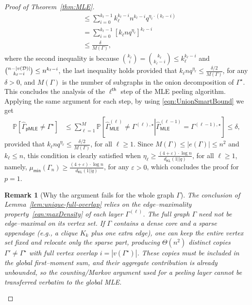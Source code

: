 \documentclass[12pt]{article}
\newtheorem{remark}{Remark}
\newcommand {\pr} {\mathbb{P}}
\newcommand{\calD}{{\cal D}}
\newcommand{\pp}[1]{\left[#1\right]}
\newcommand{\s}[1]{\mathsf{#1}}
\begin{document}
\begin{proof}[Proof of Theorem~\ref{thm:MLE}]
\begin{align}
    &\leq \sum_{i=0}^{k_\ell-1}k_\ell^{k_\ell-i}n^{k_\ell-i} q^{\eta_\ell\cdot(k_\ell-i)}\\
    & = \sum_{i=0}^{k_\ell-1}\pp{k_\ell n q^{\eta_\ell}}^{k_\ell-i}\\
    &\leq \frac{\delta}{M(\Gamma)},\label{eqn:samePP1}
\end{align}
where the second inequality is because $\binom{k_\ell}{i} = \binom{k_\ell}{k_\ell-i}\leq k_\ell^{k_\ell-i}$ and $\binom{n-|v(\calD)|}{k_\ell-i}\leq n^{k_\ell-i}$, the last inequality holds provided that $k_\ell nq^{\eta_\ell}\leq \frac{\delta/2}{M(\Gamma)}$, for any $\delta>0$, and $M(\Gamma)$ is the number of subgraphs in the onion decomposition of $\Gamma^\star$. This concludes the analysis of the $\ell^{\s{th}}$ step of the MLE peeling algorithm. Applying the same argument for each step, by using \eqref{eqn:UnionSmartBound} we get
\begin{align}
    \pr[\hat{\Gamma}_{\s{pMLE}}\neq\Gamma^{\star}] &\leq \sum_{\ell=1}^M\pr\pp{\left.\hat{\Gamma}^{(\ell)}_{\s{MLE}}\neq{\Gamma}^{(\ell),\star}\right|\hat{\Gamma}^{(\ell-1)}_{\s{MLE}}={\Gamma}^{(\ell-1),\star}}\leq \delta,\label{eqn:FinalMLEPeelP1ana}
\end{align}
provided that $k_\ell nq^{\eta_\ell}\leq \frac{\delta/2}{M(\Gamma)}$, for all $\ell\geq1$. Since $M(\Gamma)\leq|e(\Gamma)|\leq n^2$ and $k_\ell\leq n$, this condition is clearly satisfied when $\eta_\ell\geq \frac{(4+\varepsilon)\cdot \log n}{d_{\s{KL}}(1||q)}$, for all $\ell\geq1$, namely, $\mu_{\s{min}}(\Gamma_n)\geq \frac{(4+\varepsilon)\cdot \log n}{d_{\s{KL}}(1||q)}$, for any $\varepsilon>0$, which concludes the proof for $p=1$.
\begin{remark}[Why the argument fails for the whole graph $\Gamma$]
The conclusion of Lemma~\ref{lem:unique-full-overlap} relies on the \emph{edge--maximality} property~\eqref{eqn:maxDensity} of each layer $\Gamma^{(\ell)}$. The full graph $\Gamma$ need not be edge--maximal on its vertex set.  If $\Gamma$ contains a dense core and a sparse appendage (e.g., a clique $K_k$ plus one extra edge), one can keep the entire vertex set fixed and relocate only the sparse part, producing $\Theta(n^2)$ distinct copies $\Gamma'\neq\Gamma^\star$ with full vertex overlap $i=|v(\Gamma^\star)|$. These copies must be included in the global first--moment sum, and their aggregate contribution is already unbounded, so the counting/Markov argument used for a peeling layer cannot be transferred verbatim to the global MLE.
\end{remark}




\end{proof}
\end{document}
